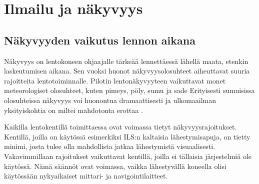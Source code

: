 \documentclass[utf8,bachelor,manualbib]{gradu3}
\begin{document}
\chapter{Ilmailu ja näkyvyys}

\section{Näkyvyyden vaikutus lennon aikana}

Näkyvyys on lentokoneen ohjaajalle tärkeää lennettäessä lähellä maata, etenkin laskeutumisen aikana. Sen vuoksi huonot näkyvyysolosuhteet aiheuttavat suuria rajoitteita lentotoiminnalle. Pilotin lentonäkyvyyteen vaikuttavat monet meteorologiset olosuhteet, kuten pimeys, pöly, sumu ja sade \citep{wickens2009} Erityisesti sumuisissa olosuhteissa näkyvyys voi huonontua dramaattisesti ja ulkomaailman yksityiskohtia on miltei mahdotonta erottaa \citep{beiergemperlein2004}.

Kaikilla lentokentillä toimittaessa ovat voimassa tietyt näkyvyysrajoitukset. Kentillä, joilla on käytössä esimerkiksi ILS:n kaltaisia lähestymisapuja, on tietty minimi, josta tulee olla mahdollista jatkaa lähestymistä visuaalisesti. Vakavimmillaan rajoitukset vaikuttavat kentillä, joilla ei tällaisia järjestelmiä ole käytössä. Nämä säännöt ovat voimassa, vaikka lähestyvällä koneella olisi käytössään nykyaikaiset mittari- ja navigointilaitteet.~\cite{mollersachs1994}
\end{document}
